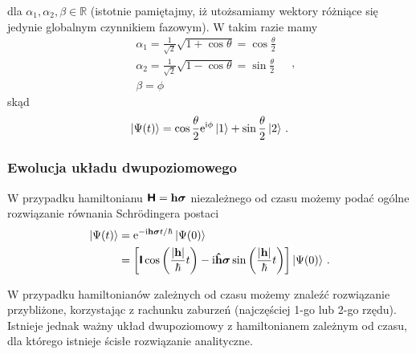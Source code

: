 \documentclass{myclass}
\begin{document}
dla \(\alpha_1,\alpha_2,\beta\in\mathbb{R}\) (istotnie pamiętajmy, iż utożsamiamy wektory różniące
się jedynie globalnym czynnikiem fazowym). W takim razie mamy
\begin{equation*}
    \begin{split}
        &\alpha_1 = \frac{1}{\sqrt{2}}\sqrt{1+\cos\theta} = \cos\frac{\theta}{2}\\
        &\alpha_2 = \frac{1}{\sqrt{2}}\sqrt{1-\cos\theta} = \sin\frac{\theta}{2}\\
        &\beta = \phi
    \end{split}\quad,
\end{equation*}
skąd
\begin{equation*}
        \ket{\Psi(t)} =\cos\frac{\theta}{2}\mathrm{e}^{\mathrm{i}\phi}\ket{1} + \sin\frac{\theta}{2}\ket{2}\,.
\end{equation*}

\subsubsection{Ewolucja układu dwupoziomowego}

W przypadku hamiltonianu \(\boldsymbol{\mathsf{H}}=\mathbf{h}\boldsymbol{\sigma}\) niezależnego od czasu możemy
podać ogólne rozwiązanie równania Schr\"{o}dingera postaci
\begin{equation*}
    \begin{split}
        \ket{\Psi(t)} &= \mathrm{e}^{-\mathrm{i}\mathbf{h}\boldsymbol{\sigma}t/\hbar}\ket{\Psi(0)} \\
        &= \left[\boldsymbol{\mathsf{I}}\cos\left(\frac{|\mathbf{h}|}{\hbar}t\right) - \mathrm{i} \mathbf{\hat{h}}\boldsymbol{\sigma}\sin\left(\frac{|\mathbf{h}|}{\hbar}t\right)\right]\ket{\Psi(0)}\,.
    \end{split}
\end{equation*}
\medskip

W przypadku hamiltonianów zależnych od czasu możemy znaleźć rozwiązanie przybliżone, korzystając z
rachunku zaburzeń (najczęściej 1-go lub 2-go rzędu). Istnieje jednak ważny układ dwupoziomowy z
hamiltonianem zależnym od czasu, dla którego istnieje ścisłe rozwiązanie analityczne.
\medskip
\end{document}
